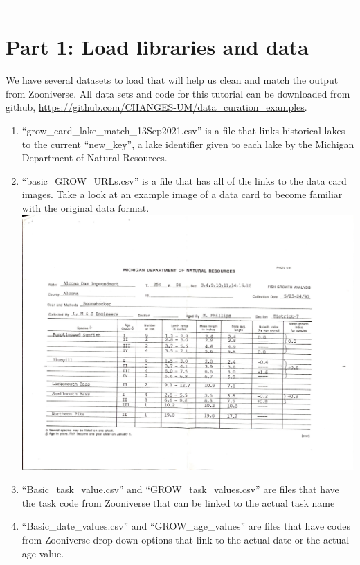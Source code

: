 \documentclass[
]{article}
\begin{document}
\begin{center}\rule{0.5\linewidth}{0.5pt}\end{center}

\hypertarget{part-1-load-libraries-and-data}{%
\section{Part 1: Load libraries and
data}\label{part-1-load-libraries-and-data}}

We have several datasets to load that will help us clean and match the
output from Zooniverse. All data sets and code for this tutorial can be
downloaded from github,
\url{https://github.com/CHANGES-UM/data_curation_examples}.

\begin{enumerate}
\def\labelenumi{\arabic{enumi})}
\item
  ``grow\_card\_lake\_match\_13Sep2021.csv'' is a file that links
  historical lakes to the current ``new\_key'', a lake identifier given
  to each lake by the Michigan Department of Natural Resources.
\item
  ``basic\_GROW\_URLs.csv'' is a file that has all of the links to the
  data card images. Take a look at an example image of a data card to
  become familiar with the original data format.
  \includegraphics{images/alconadam_grow.jpg}
\item
  ``Basic\_task\_value.csv'' and ``GROW\_task\_values.csv'' are files
  that have the task code from Zooniverse that can be linked to the
  actual task name
\item
  ``Basic\_date\_values.csv'' and ``GROW\_age\_values'' are files that
  have codes from Zooniverse drop down options that link to the actual
  date or the actual age value.
\end{enumerate}
\end{document}
